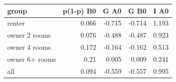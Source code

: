 \begin{tabular}{lrrrr}
\toprule
group & p(1-p) B0 & G A0 & G B0 & I A0 \\
\midrule
renter & 0.066 & -0.715 & -0.714 & 1.193 \\
owner 2 rooms & 0.076 & -0.488 & -0.487 & 0.923 \\
owner 4 rooms & 0.172 & -0.164 & -0.162 & 0.513 \\
owner 6+ rooms & 0.21 & 0.005 & 0.009 & 0.241 \\
all & 0.094 & -0.559 & -0.557 & 0.995 \\
\bottomrule
\end{tabular}
